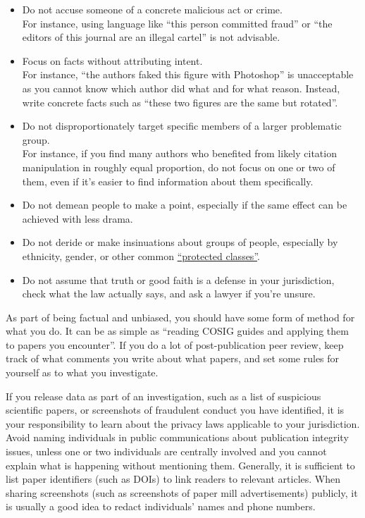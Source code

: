 \documentclass[letterpaper, 12pt]{article}
\begin{document}
\begin{itemize}
    \item Do not accuse someone of a concrete malicious act or crime. \\
    For instance, using language like ``this person committed fraud'' or ``the editors of this journal are an illegal cartel'' is not advisable.
    \item Focus on facts without attributing intent. \\
    For instance, ``the authors faked this figure with Photoshop'' is unacceptable as you cannot know which author did what and for what reason. Instead, write concrete facts such as ``these two figures are the same but rotated''.
    \item Do not disproportionately target specific members of a larger problematic group. \\
    For instance, if you find many authors who benefited from likely citation manipulation in roughly equal proportion, do not focus on one or two of them, even if it's easier to find information about them specifically.
    \item Do not demean people to make a point, especially if the same effect can be achieved with less drama.
    \item Do not deride or make insinuations about groups of people, especially by ethnicity, gender, or other common \href{https://en.wikipedia.org/wiki/Protected_group}{``protected classes''}.
    \item Do not assume that truth or good faith is a defense in your jurisdiction, check what the law actually says, and ask a lawyer if you're unsure.
\end{itemize}

As part of being factual and unbiased, you should have some form of method for what you do. It can be as simple as ``reading COSIG guides and applying them to papers you encounter''.
If you do a lot of post-publication peer review, keep track of what comments you write about what papers, and set some rules for yourself as to what you investigate.

If you release data as part of an investigation, such as a list of suspicious scientific papers, or screenshots of fraudulent conduct you have identified, it is your responsibility to learn about the privacy laws applicable to your jurisdiction.
Avoid naming individuals in public communications about publication integrity issues, unless one or two individuals are centrally involved and you cannot explain what is happening without mentioning them. Generally, it is sufficient to list paper identifiers (such as DOIs) to link readers to relevant articles.
When sharing screenshots (such as screenshots of paper mill advertisements) publicly, it is usually a good idea to redact individuals' names and phone numbers.
\end{document}
